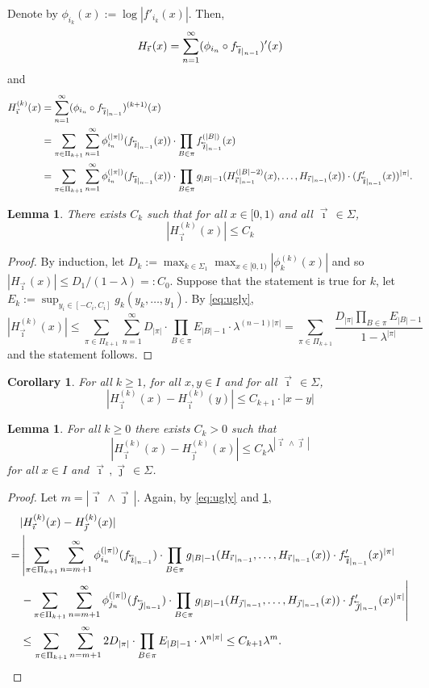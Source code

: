 \documentclass[12pt,]{article}
\newtheorem{corollary}[theorem]{Corollary}
\newtheorem{lemma}[theorem]{Lemma}
\theoremstyle{definition}
\theoremstyle{remark}
\newcommand{\0}{\mathbf{0}}
\newcommand{\cev}[1]{\reflectbox{\ensuremath{\vec{\reflectbox{\ensuremath{#1}}}}}}
\newcommand{\bi}{\vec{\imath}\,}
\newcommand{\bj}{\vec{\jmath}\,}
\newcommand{\bbi}{\,\cev{\imath}}
\newcommand{\bbj}{\,\cev{\jmath}}
\begin{document}
Denote by $\phi_{i_k}(x):= \log|f'_{i_k}(x)|$. Then,
\[
  H_{\bi}(x) = \sum_{n=1}^\infty (\phi_{i_n}\circ f_{\bbi|_{n-1}})'(x)
\]
and 
\begin{align}
  H_{\bi}^{(k)}(x) 
  &=\sum_{n=1}^\infty (\phi_{i_n}\circ f_{\bbi|_{n-1}})^{(k+1)}(x) \nonumber\\
  &=\sum_{\pi\in\Pi_{k+1}} \sum_{n=1}^\infty \phi_{i_n}^{(|\pi|)}(f_{\bbi|_{n-1}}(x))\cdot
  \prod_{B\in\pi} f_{\bbi|_{n-1}}^{(|B|)}(x)\nonumber\\
  &=\sum_{\pi\in\Pi_{k+1}} \sum_{n=1}^\infty \phi_{i_n}^{(|\pi|)}(f_{\bbi|_{n-1}}(x))\cdot
  \prod_{B\in\pi}
  g_{|B|-1}(H_{\bi|_{n-1}}^{(|B|-2)}(x),\dots,H_{\bi|_{n-1}}(x))\cdot(f'_{\bbi|_{n-1}}(x))^{|\pi|}.\label{eq:ugly}
\end{align}
\begin{lemma}\label{thm:kbound}
  There exists $C_k$ such that for all $x\in [0,1)$ and all $\bi\in\Sigma$,
  \[
    |H_{\bi}^{(k)}(x)|\leq C_k
  \]
\end{lemma}
\begin{proof}
  By induction, let $D_k:=\max_{k\in\Sigma_1}\max_{x\in[0,1)} |\phi_k^{(k)}(x)|$ and so
  $|H_{\bi}(x)| \leq D_1/(1-\lambda)=:C_0$.
  Suppose that the statement is true for $k$, let $E_k:= \sup_{y_i\in[-C_i,C_i]}g_k(y_k,\dots,y_1)$.
  By \ref{eq:ugly},
  \[
    |H_{\bi}^{(k)}(x)| \leq \sum_{\pi\in\Pi_{k+1}}\sum_{n=1}^\infty D_{|\pi|} \cdot \prod_{B\in\pi}
    E_{|B|-1} \cdot \lambda^{(n-1)|\pi|}
    = \sum_{\pi\in\Pi_{k+1}} \frac{D_{|\pi|}\prod_{B\in\pi}E_{|B|-1}}{1-\lambda^{|\pi|}}
  \]
  and the statement follows.
\end{proof}
\begin{corollary}
  \label{thm:difcor}
  For all $k\geq 1$, for all $x,y\in I$ and for all $\bi\in\Sigma$,
  \[
    |H_{\bi}^{(k)}(x) - H_{\bi}^{(k)}(y)| \leq C_{k+1}\cdot |x-y|
  \]
\end{corollary}
\begin{lemma}\label{thm:difbound}
  For all $k\geq 0$ there exists $C_k>0$ such that 
  \[
    |H_{\bi}^{(k)}(x) - H_{\bj}^{(k)}(x)| \leq C_k \lambda^{|\bi\wedge\bj|}
  \]
  for all $x\in I$ and $\bi,\bj\in\Sigma$.
\end{lemma}
\begin{proof}
  Let $m = |\bi\wedge\bj|$. Again, by \cref{eq:ugly} and \cref{thm:kbound},
  \begin{align}
    &|H_{\bi}^{(k)}(x) - H_{\bj}^{(k)}(x)| 
    \nonumber\\
    =&
    \left|
    \sum_{\pi\in\Pi_{k+1}}\sum_{n=m+1}^\infty \phi_{i_n}^{(|\pi|)}(f_{\bbi|_{n-1}})\cdot
    \prod_{B\in\pi} g_{|B|-1}(H_{\bi|_{n-1}},\dots,H_{\bi|_{n-1}}(x)) \cdot
    f_{\bbi|_{n-1}}'(x)^{|\pi|}
  \right.
    \nonumber\\
    &
    \left. -
    \sum_{\pi\in\Pi_{k+1}}\sum_{n=m+1}^\infty \phi_{j_n}^{(|\pi|)}(f_{\bbj|_{n-1}})\cdot
    \prod_{B\in\pi} g_{|B|-1}(H_{\bj|_{n-1}},\dots,H_{\bj|_{n-1}}(x)) \cdot
    f_{\bbj|_{n-1}}'(x)^{|\pi|}
      \right|\nonumber\\
    &\leq
    \sum_{\pi\in\Pi_{k+1}}\sum_{n=m+1}^\infty 2D_{|\pi|}\cdot \prod_{B\in\pi} E_{|B|-1}
    \cdot\lambda^{n|\pi|} \leq C_{k+1} \lambda^m.\nonumber
  \end{align}
\end{proof}
\end{document}
